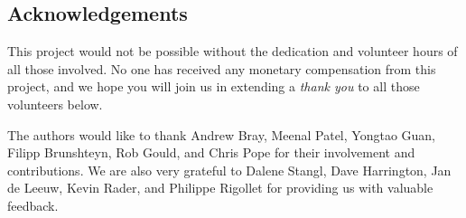 
\subsection*{Acknowledgements}

This project would not be possible without the dedication and volunteer hours of all those involved. No one has received any monetary compensation from this project, and we hope you will join us in extending a \emph{thank you} to all those volunteers below.

The authors would like to thank Andrew Bray, Meenal Patel, Yongtao Guan, Filipp Brunshteyn, Rob Gould, and Chris Pope for their involvement and contributions. %
We are also very grateful to Dalene Stangl, Dave Harrington, Jan de Leeuw, Kevin Rader, and Philippe Rigollet for providing us with valuable feedback.




